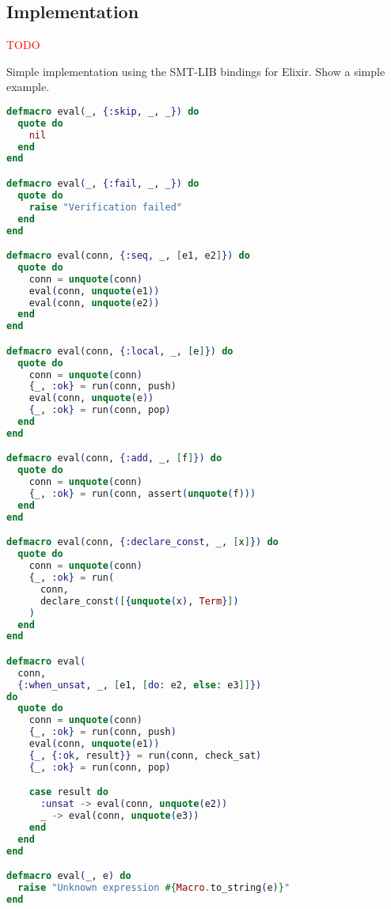\subsection{Implementation}

\textcolor{red}{TODO}

Simple implementation using the SMT-LIB bindings for Elixir. Show a simple example.

\begin{lstlisting}[language=elixir,numbers=none,frame=none]
defmacro eval(_, {:skip, _, _}) do
  quote do
    nil
  end
end

defmacro eval(_, {:fail, _, _}) do
  quote do
    raise "Verification failed"
  end
end

defmacro eval(conn, {:seq, _, [e1, e2]}) do
  quote do
    conn = unquote(conn)
    eval(conn, unquote(e1))
    eval(conn, unquote(e2))
  end
end

defmacro eval(conn, {:local, _, [e]}) do
  quote do
    conn = unquote(conn)
    {_, :ok} = run(conn, push)
    eval(conn, unquote(e))
    {_, :ok} = run(conn, pop)
  end
end

defmacro eval(conn, {:add, _, [f]}) do
  quote do
    conn = unquote(conn)
    {_, :ok} = run(conn, assert(unquote(f)))
  end
end

defmacro eval(conn, {:declare_const, _, [x]}) do
  quote do
    conn = unquote(conn)
    {_, :ok} = run(
      conn, 
      declare_const([{unquote(x), Term}])
    )
  end
end

defmacro eval(
  conn, 
  {:when_unsat, _, [e1, [do: e2, else: e3]]}) 
do
  quote do
    conn = unquote(conn)
    {_, :ok} = run(conn, push)
    eval(conn, unquote(e1))
    {_, {:ok, result}} = run(conn, check_sat)
    {_, :ok} = run(conn, pop)

    case result do
      :unsat -> eval(conn, unquote(e2))
      _ -> eval(conn, unquote(e3))
    end
  end
end

defmacro eval(_, e) do
  raise "Unknown expression #{Macro.to_string(e)}"
end
\end{lstlisting}
